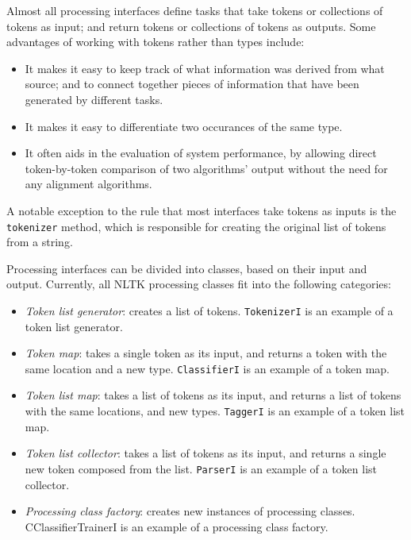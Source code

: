 \documentclass[11pt]{article}
\begin{document}
Almost all processing interfaces define tasks that take tokens or
collections of tokens as input; and return tokens or collections of
tokens as outputs.  Some advantages of working with tokens rather than
types include:

\begin{itemize}
\item It makes it easy to keep track of what information was derived
  from what source; and to connect together pieces of information that
  have been generated by different tasks.
\item It makes it easy to differentiate two occurances of the same
  type.
\item It often aids in the evaluation of system performance, by
  allowing direct token-by-token comparison of two algorithms' output
  without the need for any alignment algorithms.
\end{itemize}

A notable exception to the rule that most interfaces take tokens as
inputs is the \texttt{tokenizer} method, which is responsible for
creating the original list of tokens from a string.

\newpage
Processing interfaces can be divided into classes, based on their
input and output.  Currently, all NLTK processing classes fit into the
following categories:

\begin{itemize}
\item \textit{Token list generator}: creates a list of tokens.
  \texttt{TokenizerI} is an example of a token list generator.
\item \textit{Token map}: takes a single token as its input, and
  returns a token with the same location and a new type.
  \texttt{ClassifierI} is an example of a token map.
\item \textit{Token list map}: takes a list of tokens as its input,
  and returns a list of tokens with the same locations, and new types.
  \texttt{TaggerI} is an example of a token list map.
\item \textit{Token list collector}: takes a list of tokens as its
  input, and returns a single new token composed from the list.
  \texttt{ParserI} is an example of a token list collector.
\item \textit{Processing class factory}: creates new instances of
  processing classes.  C{ClassifierTrainerI} is an example of a
  processing class factory.
\end{itemize}
\end{document}
